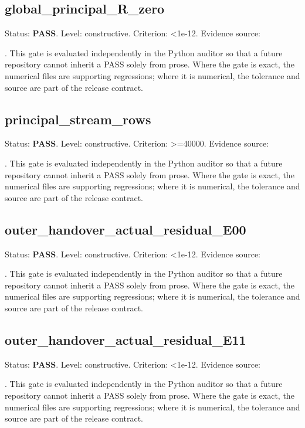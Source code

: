 \documentclass[11pt,a4paper,oneside]{book}
\begin{document}
\subsection{global\_principal\_R\_zero}
Status: \textbf{PASS}. Level: constructive. Criterion: <1e-12. Evidence source:\par\noindent{}. This gate is evaluated independently in the Python auditor so that a future repository cannot inherit a PASS solely from prose. Where the gate is exact, the numerical files are supporting regressions; where it is numerical, the tolerance and source are part of the release contract.\par

\subsection{principal\_stream\_rows}
Status: \textbf{PASS}. Level: constructive. Criterion: >=40000. Evidence source:\par\noindent{}. This gate is evaluated independently in the Python auditor so that a future repository cannot inherit a PASS solely from prose. Where the gate is exact, the numerical files are supporting regressions; where it is numerical, the tolerance and source are part of the release contract.\par

\subsection{outer\_handover\_actual\_residual\_E00}
Status: \textbf{PASS}. Level: constructive. Criterion: <1e-12. Evidence source:\par\noindent{}. This gate is evaluated independently in the Python auditor so that a future repository cannot inherit a PASS solely from prose. Where the gate is exact, the numerical files are supporting regressions; where it is numerical, the tolerance and source are part of the release contract.\par

\subsection{outer\_handover\_actual\_residual\_E11}
Status: \textbf{PASS}. Level: constructive. Criterion: <1e-12. Evidence source:\par\noindent{}. This gate is evaluated independently in the Python auditor so that a future repository cannot inherit a PASS solely from prose. Where the gate is exact, the numerical files are supporting regressions; where it is numerical, the tolerance and source are part of the release contract.\par
\end{document}
